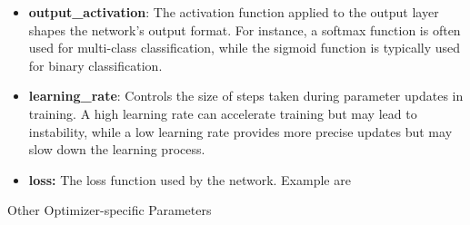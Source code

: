 \documentclass[conference]{IEEEtran}
\begin{document}
\begin{itemize}
    \item \textbf{output\_activation}: The activation function applied to the output layer shapes the network's output format. For instance, a softmax function is often used for multi-class classification, while the sigmoid function is typically used for binary classification.
    \item \textbf{learning\_rate}: Controls the size of steps taken during parameter updates in training. A high learning rate can accelerate training but may lead to instability, while a low learning rate provides more precise updates but may slow down the learning process.
    \item \textbf{loss: }The loss function used by the network. Example are 
\end{itemize}
Other Optimizer-specific Parameters
\end{document}
